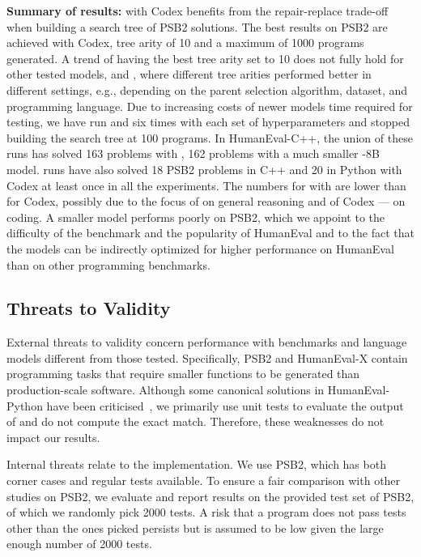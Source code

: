 \begin{framed}\noindent
\textbf{Summary of \method{} results:} 
\method{} with Codex benefits from the repair-replace trade-off when building a search tree of PSB2 solutions. The best results on PSB2 are achieved with Codex, tree arity of 10 and a maximum of 1000 programs generated. A trend of having the best tree arity set to 10 does not fully hold for other tested models, \gpt{} and \llama{}, where different tree arities performed better in different settings, e.g., depending on the parent selection algorithm, dataset, and programming language. 
Due to increasing costs of newer models time required for testing, we have run \gpt{} and \llama{} six times with each set of hyperparameters and stopped building the search tree at 100 programs. 
In HumanEval-C++, the union of these runs has solved 163 problems with \gpt{}, 162 problems with a much smaller \llama{}-8B model.
\method{} runs have also solved 18 PSB2 problems in C++ and 20 in Python with Codex at least once in all the experiments. 
The numbers for \method{} with \gpt{} are lower than for Codex, possibly due to the focus of \gpt{} on general reasoning and of Codex --- on coding.
A smaller \llama{} model performs poorly on PSB2, which we appoint to the difficulty of the benchmark and the popularity of HumanEval and to the fact that the models can be indirectly optimized for higher performance on HumanEval than on other programming benchmarks.
\end{framed}


\subsection{Threats to Validity}
\label{sec:threats}

External threats to validity concern \method{} performance with benchmarks and language models different from those tested. 
Specifically, PSB2 and HumanEval-X contain programming tasks that require smaller functions to be generated than production-scale software.
Although some canonical solutions in HumanEval-Python have been criticised~\cite{liu2023:your}, we primarily use unit tests to evaluate the output of \method{} and do not compute the exact match. Therefore, these weaknesses do not impact our results.

Internal threats relate to the implementation.
We use PSB2, which has both corner cases and regular tests available. 
To ensure a fair comparison with other studies on PSB2, we evaluate and report results on the provided test set of PSB2, of which we randomly pick 2000 tests. 
A risk that a program does not pass tests other than the ones picked persists but is assumed to be low given the large enough number of 2000 tests. 

